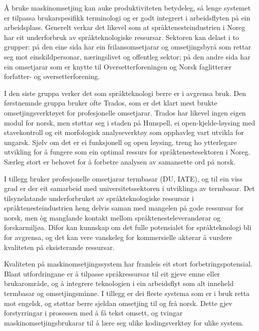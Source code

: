 \begin{multicols}{2}
Å bruke maskinomsetjing kan auke produktiviteten betydeleg, så lenge systemet er tilpassa brukarspesifikk terminologi og er godt integrert i arbeidsflyten på ein arbeidsplass. Generelt verkar det likevel som at språktenesteindustrien i Noreg har eit underforbruk av språkteknologiske ressursar. 
Sektoren kan delast i to grupper: på den eine sida har ein frilansomsetjarar og omsetjingsbyrå som rettar seg mot einskildpersonar, næringslivet og offentleg sektor; på den andre sida har ein omsetjarar som er knytte til Oversetterforeningen og Norsk faglitterær forfatter- og oversetterforening.

I den siste gruppa verker det som språkteknologi berre er i avgrensa bruk. Den førstnemnde gruppa bruker ofte Trados, som er det klart mest brukte omsetjingsverktøyet for profesjonelle omsetjarar. Trados har likevel ingen eigen modul for norsk, men støttar seg i staden på Hunspell, ei open-kjelde-løysing med stavekontroll og eit morfologisk analyseverktøy som opphavleg vart utvikla for ungarsk. Sjølv om det er ei funksjonell og open løysing, treng ho ytterlegare utvikling for å fungere som ein optimal ressurs for språktenestesektoren i Noreg. Særleg stort er behovet for å forbetre analysen av samansette ord på norsk. 

I tillegg bruker profesjonelle omsetjarar termbasar (DU, IATE), og til ein viss grad er der eit samarbeid med universitetssektoren i utviklinga av termbasar. Det tilsynelatande underforbruket av språkteknologiske ressursar i språktenesteindustrien heng delvis saman med mangelen på gode ressursar for norsk, men òg manglande kontakt mellom språktenesteleverandørar og forskarmiljøa. Difor kan kunnskap om det fulle potensialet for språkteknologi bli for avgrensa, og det kan vere vanskeleg for kommersielle aktørar å vurdere kvaliteten på eksisterande ressursar.

Kvaliteten på maskinomsetjingssystem har framleis eit stort forbetringspotensial. Blant utfordringane er å tilpasse språkressursar til eit gjeve emne eller brukarområde, og å integrere teknologien i ein arbeidsflyt som alt inneheld termbasar og omsetjingsminne. I tillegg er dei fleste systema som er i bruk retta mot engelsk, og støttar berre sjeldan omsetjing til og frå norsk. Dette gjev forstyrringar i prosessen med å få tekst omsett, og tvingar maskinomsetjingsbrukarar til å lære seg ulike kodingsverktøy for ulike system.


\end{multicols}
